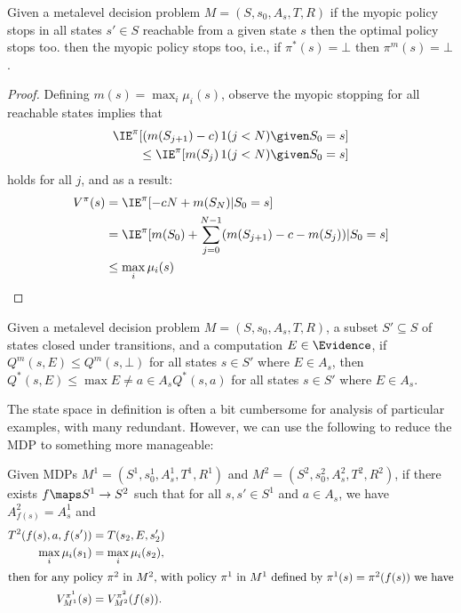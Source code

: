 
\begin{thm}\label{thm:myopic-optimal}
	Given a metalevel decision problem $M=(S,s_0,A_s,T,R)$
	if the myopic policy stops in all states $s'\in S$ reachable
	from a given state $s$ then the optimal policy stops too.
	then the myopic policy stops too, i.e., if $\pi^*(s)=\bot$ then $\pi^m(s)=\bot$.
\end{thm}

\begin{proof}
Defining $m(s) = \max_i\mu_i(s)$, observe the myopic stopping for all
reachable states implies that
\begin{align*}
	\IE^{\pi}[(m(S_{j+1}) - c)\, 1(j<N)\given S_0=s] \\
	\le \IE^{\pi}[m(S_{j})\, 1(j<N)\given S_0=s]
\end{align*}
holds for all $j$, and as a result:
\begin{align*}
	V^\pi(s) 
	&= \IE^{\pi}[ - c N + m(S_N) |S_0=s] \\
	&= \IE^{\pi}[m(S_0) + \sum_{j=0}^{N-1} (m(S_{j+1}) - c - m(S_j)) |S_0=s] \\	
	&\le \max_i\mu_i(s) \qedhere
\end{align*}
\end{proof}



\begin{thm}\label{thm:closed}
	Given a metalevel decision problem $M=(S,s_0,A_s,T,R)$,
	a subset $S'\subseteq S$ of states closed under transitions,
	and a computation $E\in\Evidence$,
	if $Q^m(s,E) \le Q^m(s,\bot)$ for all states $s\in S'$ where $E\in A_s$,
	then $Q^*(s,E) \le \max{E\neq a\in A_s} Q^*(s,a)$ for all states $s\in S'$ where $E\in A_s$.
\end{thm}










The state space in definition  is often a bit cumbersome for analysis
of particular examples, with many redundant.  However, we can use the following to reduce 
the MDP to something more manageable:
\begin{lmm}\label{lmm:equivalent-mdp}
	Given MDPs $M^1=(S^1,s^1_0,A^1_s,T^1,R^1)$ and $M^2=(S^2,s^2_0,A^2_s,T^2,R^2)$,
	if there exists $f\maps S^1\to S^2$ such that for all $s,s'\in S^1$ and $a\in A_s$,
	we have $A^2_{f(s)} = A^1_s$ and
	\begin{align*}
		T^2(f(s),a,f(s')) &= T(s_2,E,s_2') \\
		\max_i \mu_i(s_1) &= \max_i \mu_i(s_2),\\
	\intertext{then for any policy $\pi^2$ in $M^2$, with policy $\pi^1$ in $M^1$
	defined by $\pi^1(s) = \pi^2(f(s))$ we have}
		V^{\pi^1}_{M^1}(s) &= V^{\pi^2}_{M^2}(f(s)).
	\end{align*}
\end{lmm}




